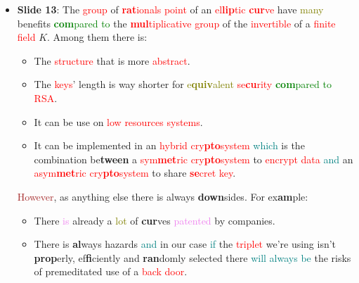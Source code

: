 \begin{itemize}
        \item \textbf{Slide 13}: The \textcolor{red}{group} of \textcolor{red}{\textbf{rat}ionals
                point} of an \textcolor{red}{el\textbf{lip}tic
            \textbf{cur}ve} have \textcolor{olive}{many} benefits
            \textcolor{green}{\textbf{com}pared to} the \textcolor{red}{\textbf{mul}tiplicative
                group} of the
            \textcolor{red}{invertible} of a \textcolor{red}{finite field} $K$. Among them there is:
            \begin{itemize}
                \item The \textcolor{red}{structure} that is more \textcolor{red}{abstract}.
                \item The \textcolor{red}{keys}' length is way shorter for
                    \textcolor{olive}{e\textbf{quiv}alent}
                    \textcolor{red}{se\textbf{cu}rity} \textcolor{green}{\textbf{com}pared to} \textcolor{red}{RSA}.
                \item It can be use on \textcolor{red}{low resources systems}.
                \item It can be implemented in an \textcolor{red}{hybrid
                        cry\textbf{pto}system} \textcolor{teal}{which} is the
                    combination be\textbf{tween} a \textcolor{red}{sym\textbf{met}ric
                        cry\textbf{pto}system} to \textcolor{red}{encrypt data}
                        \textcolor{teal}{and}
                    an \textcolor{red}{asym\textbf{met}ric cry\textbf{pto}system} to share
                    \textcolor{red}{\textbf{se}cret key}.
            \end{itemize}

            \textcolor{brown}{However}, as anything else there is always \textbf{down}sides. For ex\textbf{am}ple:
            \begin{itemize}
                \item There \textcolor{violet}{is} already a \textcolor{olive}{lot} of \textbf{cur}ves
                    \textcolor{violet}{patented} by companies.
                \item There is \textbf{al}ways hazards \textcolor{teal}{and} in our case \textcolor{teal}{if} the \textcolor{red}{triplet}
                    we're
                    using isn't 
                    \textbf{prop}erly, ef\textbf{fi}ciently and \textbf{ran}domly selected there \textcolor{teal}{will
                        always be} the
                    risks of premeditated 
                    use of a \textcolor{red}{back door}. 
            \end{itemize}
\end{itemize}

